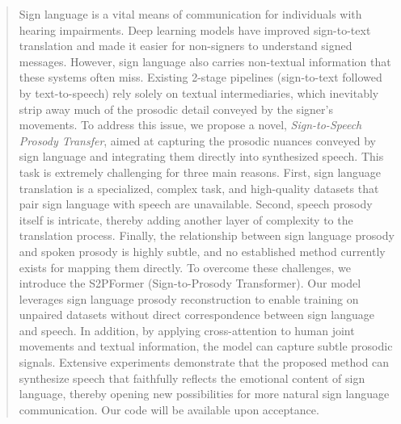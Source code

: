 

\begin{abstract}
Sign language is a vital means of communication for individuals with hearing impairments.
Deep learning models have improved sign-to-text translation and made it easier for non-signers to understand signed messages.
However, sign language also carries non-textual information that these systems often miss.
Existing 2-stage pipelines (sign-to-text followed by text-to-speech) rely solely on textual intermediaries,
which inevitably strip away much of the prosodic detail conveyed by the signer's movements.
To address this issue, we propose a novel, \emph{Sign-to-Speech  Prosody Transfer},
aimed at capturing the  prosodic nuances conveyed by sign language 
and integrating them directly into synthesized speech.
This task is extremely challenging for three main reasons.
First, sign language translation is a specialized, complex task, and high-quality datasets that pair sign language with speech are unavailable.
Second, speech prosody itself is intricate, thereby adding another layer of complexity to the translation process.
Finally, the relationship between sign language prosody and spoken prosody is highly subtle, and no established method currently exists for mapping them directly.
To overcome these challenges, we introduce the S2PFormer (Sign-to-Prosody Transformer).
Our model leverages sign language prosody reconstruction to enable training on unpaired datasets without direct correspondence between sign language and speech.
In addition, by applying cross-attention to human joint movements and textual information, the model can capture subtle prosodic signals.
Extensive experiments demonstrate that the proposed method can synthesize speech that faithfully reflects the emotional content of sign language, thereby opening new possibilities for more natural sign language communication. Our code will be available upon acceptance.

\end{abstract}
